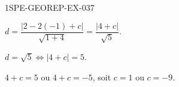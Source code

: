 \begin{corrige}{1SPE-GEOREP-EX-037}


$d = \dfrac{|2 - 2(-1) + c|}{\sqrt{1 + 4}} = \dfrac{|4 + c|}{\sqrt{5}}$.

$d = \sqrt{5} \iff |4 + c| = 5$.

$4 + c = 5$ ou $4 + c = -5$, soit $\boxed{c = 1}$ ou $\boxed{c = -9}$.

\end{corrige}
